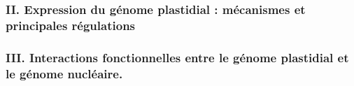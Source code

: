 \documentclass[
]{article}
\begin{document}
\hypertarget{ii.-expression-du-guxe9nome-plastidial-muxe9canismes-et-principales-ruxe9gulations}{%
\subsubsection{II. Expression du génome plastidial : mécanismes et
principales
régulations}\label{ii.-expression-du-guxe9nome-plastidial-muxe9canismes-et-principales-ruxe9gulations}}

\hypertarget{iii.-interactions-fonctionnelles-entre-le-guxe9nome-plastidial-et-le-guxe9nome-nucluxe9aire.}{%
\subsubsection{III. Interactions fonctionnelles entre le génome
plastidial et le génome
nucléaire.}\label{iii.-interactions-fonctionnelles-entre-le-guxe9nome-plastidial-et-le-guxe9nome-nucluxe9aire.}}
\end{document}
